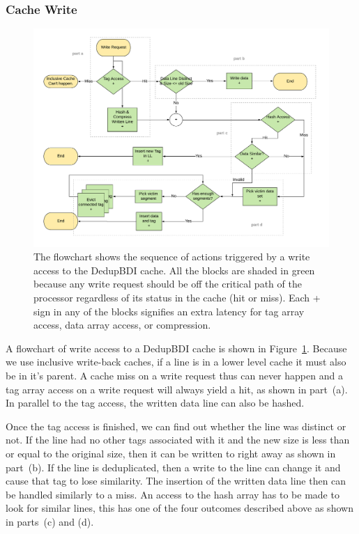 \subsubsection{Cache Write}
\begin{figure}
    \includegraphics[width=\textwidth]{DedupBDI_Write.pdf}
    \caption[DedupBDI Write]{The flowchart shows the sequence of actions triggered by a write access to the DedupBDI cache. All the blocks are shaded in green because any write request should be off the critical path of the processor regardless of its status in the cache (hit or miss). Each + sign in any of the blocks signifies an extra latency for tag array access, data array access, or compression.}
    \label{fig:DedupBDI_Write}
\end{figure}
A flowchart of write access to a DedupBDI cache is shown in Figure~\ref{fig:DedupBDI_Write}. Because we use inclusive write-back caches, if a line is in a lower level cache it must also be in it's parent. A cache miss on a write request thus can never happen and a tag array access on a write request will always yield a hit, as shown in part~(a). In parallel to the tag access, the written data line can also be hashed.\par
Once the tag access is finished, we can find out whether the line was distinct or not. If the line had no other tags associated with it and the new size is less than or equal to the original size, then it can be written to right away as shown in part~(b). If the line is deduplicated, then a write to the line can change it and cause that tag to lose similarity. The insertion of the written data line then can be handled similarly to a miss. An access to the hash array has to be made to look for similar lines, this has one of the four outcomes described above as shown in parts~(c) and (d).

